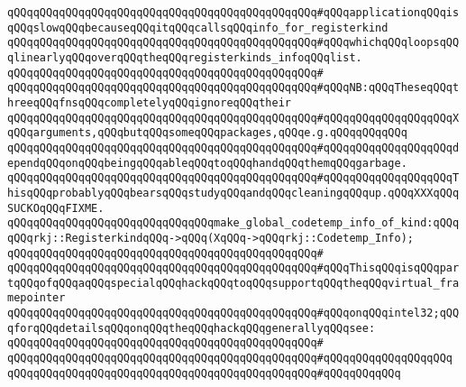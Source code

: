 \verb|qQQqqQQqqQQqqQQqqQQqqQQqqQQqqQQqqQQqqQQqqQQqqQQq#qQQqapplicationqQQqisqQQqslowqQQqbecauseqQQqitqQQqcallsqQQqinfo_for_registerkind|\newline
\verb|qQQqqQQqqQQqqQQqqQQqqQQqqQQqqQQqqQQqqQQqqQQqqQQq#qQQqwhichqQQqloopsqQQqlinearlyqQQqoverqQQqtheqQQqregisterkinds_infoqQQqlist.|\newline
\verb|qQQqqQQqqQQqqQQqqQQqqQQqqQQqqQQqqQQqqQQqqQQqqQQq#|\newline
\verb|qQQqqQQqqQQqqQQqqQQqqQQqqQQqqQQqqQQqqQQqqQQqqQQq#qQQqNB:qQQqTheseqQQqthreeqQQqfnsqQQqcompletelyqQQqignoreqQQqtheir|\newline
\verb|qQQqqQQqqQQqqQQqqQQqqQQqqQQqqQQqqQQqqQQqqQQqqQQq#qQQqqQQqqQQqqQQqqQQqXqQQqarguments,qQQqbutqQQqsomeqQQqpackages,qQQqe.g.qQQqqQQqqQQq|\newline
\verb|qQQqqQQqqQQqqQQqqQQqqQQqqQQqqQQqqQQqqQQqqQQqqQQq#qQQqqQQqqQQqqQQqqQQqdependqQQqonqQQqbeingqQQqableqQQqtoqQQqhandqQQqthemqQQqgarbage.|\newline
\verb|qQQqqQQqqQQqqQQqqQQqqQQqqQQqqQQqqQQqqQQqqQQqqQQq#qQQqqQQqqQQqqQQqqQQqThisqQQqprobablyqQQqbearsqQQqstudyqQQqandqQQqcleaningqQQqup.qQQqXXXqQQqSUCKOqQQqFIXME.|\newline
\newline
\verb|qQQqqQQqqQQqqQQqqQQqqQQqqQQqqQQqmake_global_codetemp_info_of_kind:qQQqqQQqrkj::RegisterkindqQQq->qQQq(XqQQq->qQQqrkj::Codetemp_Info);|\newline
\verb|qQQqqQQqqQQqqQQqqQQqqQQqqQQqqQQqqQQqqQQqqQQqqQQq#|\newline
\verb|qQQqqQQqqQQqqQQqqQQqqQQqqQQqqQQqqQQqqQQqqQQqqQQq#qQQqThisqQQqisqQQqpartqQQqofqQQqaqQQqspecialqQQqhackqQQqtoqQQqsupportqQQqtheqQQqvirtual_framepointer|\newline
\verb|qQQqqQQqqQQqqQQqqQQqqQQqqQQqqQQqqQQqqQQqqQQqqQQq#qQQqonqQQqintel32;qQQqforqQQqdetailsqQQqonqQQqtheqQQqhackqQQqgenerallyqQQqsee:|\newline
\verb|qQQqqQQqqQQqqQQqqQQqqQQqqQQqqQQqqQQqqQQqqQQqqQQq#|\newline
\verb|qQQqqQQqqQQqqQQqqQQqqQQqqQQqqQQqqQQqqQQqqQQqqQQq#qQQqqQQqqQQqqQQqqQQq|\newline
\verb|qQQqqQQqqQQqqQQqqQQqqQQqqQQqqQQqqQQqqQQqqQQqqQQq#qQQqqQQqqQQq|\newline
